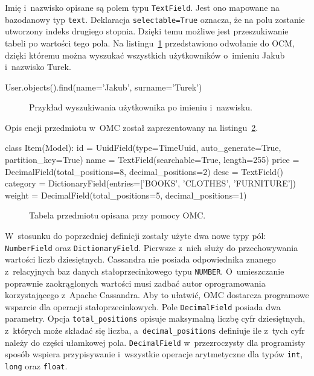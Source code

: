 Imię i~nazwisko opisane są polem typu \verb+TextField+. Jest ono mapowane na bazodanowy typ \verb+text+. Deklaracja \verb+selectable=True+ oznacza, że na polu zostanie utworzony indeks drugiego stopnia. Dzięki temu możliwe jest przeszukiwanie tabeli po wartości tego pola. Na listingu~\ref{lst:user_search_by_name_surname} przedstawiono odwołanie do OCM, dzięki któremu można wyszukać wszystkich użytkowników o~imieniu Jakub i~nazwisko Turek.

\begin{verbbox}
	User.objects().find(name='Jakub', surname='Turek')
\end{verbbox}

\begin{figure}[ht!]
	\centering
	\theverbbox
	\caption{Przykład wyszukiwania użytkownika po imieniu i~nazwisku.}
	\label{lst:user_search_by_name_surname}
\end{figure}

Opis encji przedmiotu w~OMC został zaprezentowany na listingu~\ref{lst:omc_item_definition}. 

\begin{verbbox}
class Item(Model):
    id = UuidField(type=TimeUuid, auto_generate=True, partition_key=True)
    name = TextField(searchable=True, length=255)
    price = DecimalField(total_positions=8, decimal_positions=2)
    desc = TextField()
    category = DictionaryField(entries=['BOOKS', 'CLOTHES', 'FURNITURE'])
    weight = DecimalField(total_positions=5, decimal_positions=1)
\end{verbbox}

\begin{figure}[ht!]
	\centering
	\theverbbox
	\caption{Tabela przedmiotu opisana przy pomocy OMC.}
	\label{lst:omc_item_definition}
\end{figure}

W~stosunku do poprzedniej definicji zostały użyte dwa nowe typy pól: \verb+NumberField+ oraz \verb+DictionaryField+. Pierwsze z~nich służy do przechowywania wartości liczb dziesiętnych. Cassandra nie posiada odpowiednika znanego z~relacyjnych baz danych stałoprzecinkowego typu \verb+NUMBER+. O~umieszczanie poprawnie zaokrąglonych wartości musi zadbać autor oprogramowania korzystającego z~Apache Cassandra. Aby to ułatwić, OMC dostarcza programowe wsparcie dla operacji stałoprzecinkowych. Pole \verb+DecimalField+ posiada dwa parametry. Opcja \verb+total_positions+ opisuje maksymalną liczbę cyfr dziesiętnych, z~których może składać się liczba, a~\verb+decimal_positions+ definiuje ile z~tych cyfr należy do części ułamkowej pola. \verb+DecimalField+ w~przezroczysty dla programisty sposób wspiera przypisywanie i~wszystkie operacje arytmetyczne dla typów \verb+int+, \verb+long+ oraz \verb+float+.

